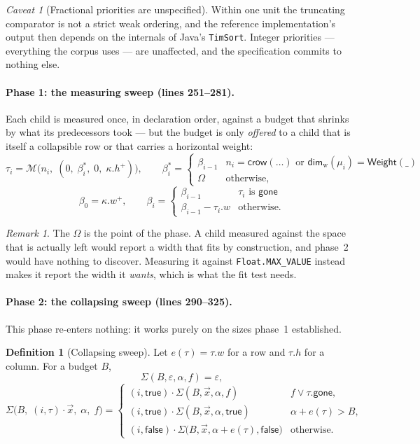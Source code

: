 \documentclass[11pt,a4paper]{article}
\newcommand{\Om}{\Omega}
\newcommand{\Weight}{\mathsf{Weight}}
\newcommand{\crow}{\mathsf{crow}}
\newcommand{\gone}{\mathsf{gone}}
\newcommand{\Mm}{\mathcal{M}}          %
\newcommand{\Dimw}{\mathsf{dim}_{\mathrm{w}}}
\newcommand{\jv}[1]{\texttt{#1}}       %
\theoremstyle{definition}
\newtheorem{definition}{Definition}[section]
\theoremstyle{plain}
\theoremstyle{remark}
\newtheorem*{remark}{Remark}
\newtheorem{warning}{Caveat}[section]
\begin{document}
\begin{warning}[Fractional priorities are unspecified]
Within one unit the truncating comparator is not a strict weak ordering, and the
reference implementation's output then depends on the internals of Java's
\jv{TimSort}. Integer priorities --- everything the corpus uses --- are
unaffected, and the specification commits to nothing else.
\end{warning}

\paragraph{Phase 1: the measuring sweep (lines 251--281).}
Each child is measured once, in declaration order, against a budget that shrinks
by what its predecessors took --- but the budget is only \emph{offered} to a
child that is itself a collapsible row or that carries a horizontal weight:
\[
  \tau_i = \Mm\bigl(n_i,\; (0,\; \beta^{\ast}_i,\; 0,\; \kappa.h^+)\bigr),
  \qquad
  \beta^{\ast}_i = \begin{cases}
    \beta_{i-1} & n_i = \crow(\ldots) \text{ or } \Dimw(\mu_i) = \Weight(\_) \\
    \Om & \text{otherwise,}
  \end{cases}
\]
\[
  \beta_0 = \kappa.w^+,
  \qquad
  \beta_i = \begin{cases}
    \beta_{i-1} & \tau_i \text{ is } \gone \\
    \beta_{i-1} - \tau_i.w & \text{otherwise.}
  \end{cases}
\]

\begin{remark}
The $\Om$ is the point of the phase. A child measured against the space that is
actually left would report a width that fits by construction, and phase~2 would
have nothing to discover. Measuring it against \jv{Float.MAX\_VALUE} instead
makes it report the width it \emph{wants}, which is what the fit test needs.
\end{remark}

\paragraph{Phase 2: the collapsing sweep (lines 290--325).}
This phase re-enters nothing: it works purely on the sizes phase~1 established.

\begin{definition}[Collapsing sweep]
Let $e(\tau) = \tau.w$ for a row and $\tau.h$ for a column. For a budget $B$,
\[
  \Sigma(B, \varepsilon, \alpha, f) = \varepsilon,
\]
\[
  \Sigma\bigl(B,\; (i,\tau)\cdot\vec{x},\; \alpha,\; f\bigr) = \begin{cases}
    (i, \textsf{true}) \cdot \Sigma(B, \vec{x}, \alpha, f)
      & f \vee \tau.\gone, \\[2pt]
    (i, \textsf{true}) \cdot \Sigma(B, \vec{x}, \alpha, \textsf{true})
      & \alpha + e(\tau) > B, \\[2pt]
    (i, \textsf{false}) \cdot \Sigma\bigl(B, \vec{x}, \alpha + e(\tau), \textsf{false}\bigr)
      & \text{otherwise.}
  \end{cases}
\]
\end{definition}
\end{document}
